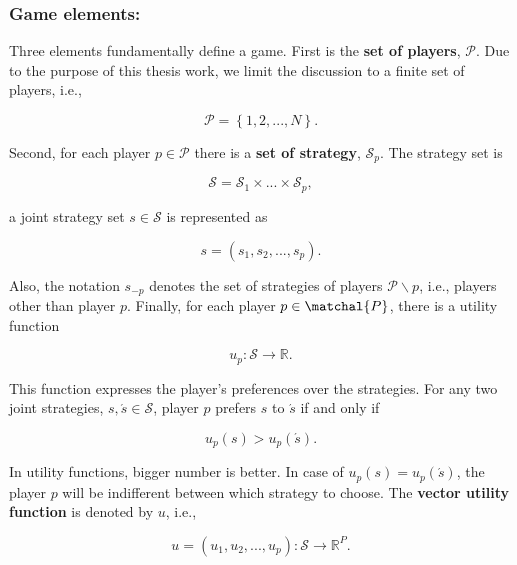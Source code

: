 \subsubsection{Game elements:}

Three elements fundamentally define a game. First is the \textbf{set of players}, $\mathcal{P}$. Due to the purpose of this thesis work, we limit the discussion to a finite set of players, i.e., 

\begin{equation*}
\mathcal{P}= \left\{ 1,2,..., N \right\}.
\end{equation*}

Second, for each player $p \in \mathcal{P}$ there is a \textbf{set of strategy}, $\mathcal{S}_p$. The strategy set is 

\begin{equation*}
\mathcal{S} = \mathcal{S}_1 \times ... \times \mathcal{S}_p,
\end{equation*}

a joint strategy set $s \in \mathcal{S}$ is represented as 

\begin{equation*}
s = (s_1,s_2,...,s_p).
\end{equation*}

Also, the notation $s_{-p}$ denotes the set of strategies of players $\mathcal{P} \backslash p$, i.e., players other than player $p$. Finally, for each player $p \in \matchal{P}$, there is a utility function 

\begin{equation*}
u_p : \mathcal{S} \to \mathbb{R}.
\end{equation*}

This function expresses the player's preferences over the strategies. For any two joint strategies, $s, \acute{s} \in \mathcal{S}$, player $p$ prefers $s$ to $\acute{s}$ if and only if

\begin{equation*}
 u_p(s) > u_p(\acute{s}).
\end{equation*}

In utility functions, bigger number is better. In case of $u_p(s) = u_p(\acute{s})$, the player $p$ will be indifferent between which strategy to choose. The \textbf{vector utility function} is denoted by $u$, i.e.,

\begin{equation*}
u = (u_1, u_2, ..., u_p) : \mathcal{S} \to \mathbb{R}^P.
\end{equation*}

